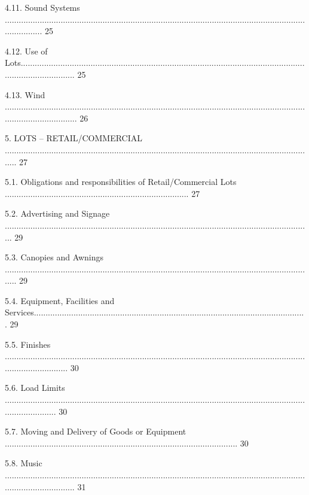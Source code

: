 \documentclass{article}
\begin{document}
{\fontsize{9.99}{1}4.11. Sound Systems ................................................................................................................................................. 25 }

{\fontsize{9.99}{1}4.12. Use of Lots........................................................................................................................................................ 25 }

{\fontsize{9.99}{1}4.13. Wind ................................................................................................................................................................ 26 }

{\fontsize{9.99}{1}5. LOTS – RETAIL/COMMERCIAL ...................................................................................................................................... 27 }

{\fontsize{9.99}{1}5.1. Obligations and responsibilities of Retail/Commercial Lots ............................................................................... 27 }

{\fontsize{9.99}{1}5.2. Advertising and Signage .................................................................................................................................... 29 }

{\fontsize{9.99}{1}5.3. Canopies and Awnings ...................................................................................................................................... 29 }

{\fontsize{9.99}{1}5.4. Equipment, Facilities and Services..................................................................................................................... 29 }

{\fontsize{9.99}{1}5.5. Finishes ............................................................................................................................................................ 30 }

{\fontsize{9.99}{1}5.6. Load Limits ....................................................................................................................................................... 30 }

{\fontsize{9.99}{1}5.7. Moving and Delivery of Goods or Equipment .................................................................................................... 30 }

{\fontsize{9.99}{1}5.8. Music ............................................................................................................................................................... 31 }
\end{document}
